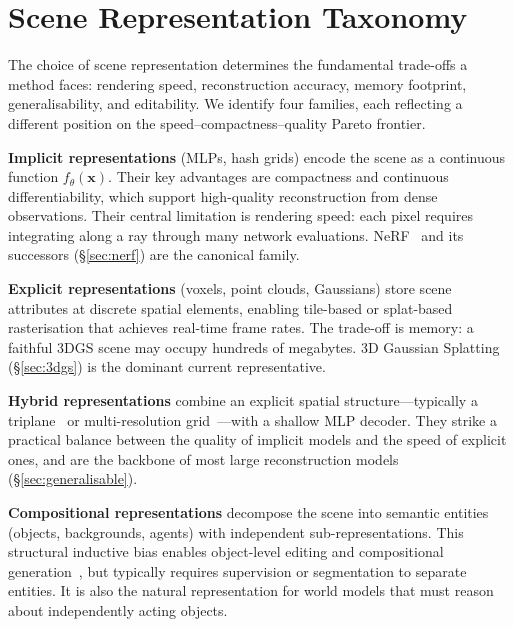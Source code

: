 \section{Scene Representation Taxonomy}
\label{sec:representation}

The choice of scene representation determines the fundamental trade-offs a
method faces: rendering speed, reconstruction accuracy, memory footprint,
generalisability, and editability.
We identify four families, each reflecting a different position on the
speed--compactness--quality Pareto frontier.

\textbf{Implicit representations} (MLPs, hash grids) encode the scene as a
continuous function $f_\theta(\mathbf{x})$.
Their key advantages are compactness and continuous differentiability, which
support high-quality reconstruction from dense observations.
Their central limitation is rendering speed: each pixel requires integrating
along a ray through many network evaluations.
NeRF~\citep{mildenhall2020nerf} and its successors (§\ref{sec:nerf}) are the
canonical family.

\textbf{Explicit representations} (voxels, point clouds, Gaussians) store scene
attributes at discrete spatial elements, enabling tile-based or splat-based
rasterisation that achieves real-time frame rates.
The trade-off is memory: a faithful 3DGS scene may occupy hundreds of megabytes.
3D Gaussian Splatting~\citep{kerbl2023gaussian} (§\ref{sec:3dgs}) is the
dominant current representative.

\textbf{Hybrid representations} combine an explicit spatial structure---typically
a triplane~\citep{chan2022efficient} or multi-resolution
grid~\citep{muller2022instant}---with a shallow MLP decoder.
They strike a practical balance between the quality of implicit models and
the speed of explicit ones, and are the backbone of most large reconstruction
models (§\ref{sec:generalisable}).

\textbf{Compositional representations} decompose the scene into semantic
entities (objects, backgrounds, agents) with independent sub-representations.
This structural inductive bias enables object-level editing and compositional
generation~\citep{niemeyer2021giraffe,zhou2024gala3d}, but typically requires
supervision or segmentation to separate entities.
It is also the natural representation for world models that must reason about
independently acting objects.

